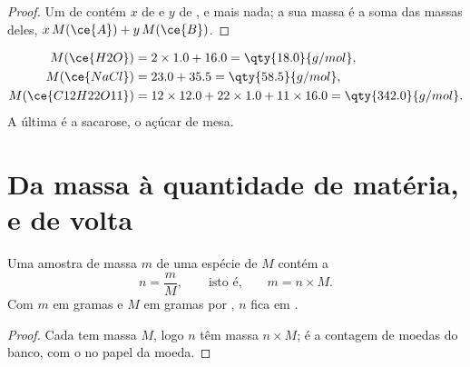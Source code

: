 \begin{proof}
Um  de   contém $x$  de   e $y$
 de  , e mais nada; a sua massa é a soma das massas
deles, $x\,M(\ce{A}) + y\,M(\ce{B})$.
\end{proof}

\begin{example}\label{ex:g10:the-mole:three}
\begin{align*}
  M(\ce{H2O}) &= 2 \times 1.0 + 16.0 = \qty{18.0}{g/mol},\\
  M(\ce{NaCl}) &= 23.0 + 35.5 = \qty{58.5}{g/mol},\\
  M(\ce{C12H22O11}) &= 12 \times 12.0 + 22 \times 1.0 + 11 \times 16.0
     = \qty{342.0}{g/mol}.
\end{align*}
A última é a sacarose, o açúcar de mesa.
\end{example}

\section{Da massa à quantidade de matéria, e de volta}

\begin{proposition}\label{prop:g10:the-mole:mass}
Uma amostra de massa $m$ de uma espécie de  $M$ contém a
\[
  n = \frac{m}{M}, \qquad\text{isto é,}\qquad m = n \times M .
\]
Com $m$ em gramas e $M$ em gramas por , $n$ fica em .
\end{proposition}

\begin{proof}
Cada  tem massa $M$, logo $n$  têm massa $n \times M$; é a
contagem de moedas do banco, com o  no papel da moeda.
\end{proof}

